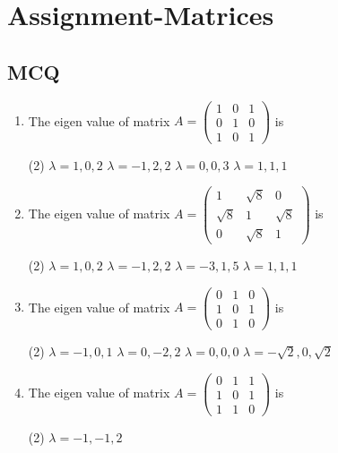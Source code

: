 \chapter{Assignment-Matrices}
\section{MCQ}
\begin{enumerate}
	\item The eigen value of matrix $A=\left(\begin{array}{lll}1 & 0 & 1 \\ 0 & 1 & 0 \\ 1 & 0 & 1\end{array}\right)$ is
	 \begin{tasks}(2)
		\task[\textbf{a.}] $\lambda=1,0,2$
		\task[\textbf{b.}]$\lambda=-1,2,2$
		\task[\textbf{c.}] $\lambda=0,0,3$
		\task[\textbf{d.}] $\lambda=1,1,1$
	\end{tasks}
	\item The eigen value of matrix $A=\left(\begin{array}{ccc}1 & \sqrt{8} & 0 \\ \sqrt{8} & 1 & \sqrt{8} \\ 0 & \sqrt{8} & 1\end{array}\right)$ is
	 \begin{tasks}(2)
		\task[\textbf{a.}]$\lambda=1,0,2$
		\task[\textbf{b.}]$\lambda=-1,2,2$
		\task[\textbf{c.}]$\lambda=-3,1,5$
		\task[\textbf{d.}]$\lambda=1,1,1$
	\end{tasks}
	\item The eigen value of matrix $A=\left(\begin{array}{lll}0 & 1 & 0 \\ 1 & 0 & 1 \\ 0 & 1 & 0\end{array}\right)$ is
	 \begin{tasks}(2)
		\task[\textbf{a.}]$\lambda=-1,0,1$
		\task[\textbf{b.}]$\lambda=0,-2,2$
		\task[\textbf{c.}]$\lambda=0,0,0$
		\task[\textbf{d.}]  $\lambda=-\sqrt{2}, 0, \sqrt{2}$
	\end{tasks}
	\item The eigen value of matrix $A=\left(\begin{array}{lll}0 & 1 & 1 \\ 1 & 0 & 1 \\ 1 & 1 & 0\end{array}\right)$ is
	 \begin{tasks}(2)
		\task[\textbf{a.}] $\lambda=-1,-1,2$

\end{tasks}
\end{enumerate}
